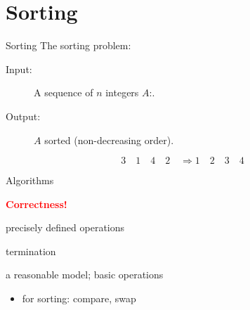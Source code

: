 \section{Sorting}

\begin{frame}{Sorting}
  The sorting problem:
  \begin{description}
	\item[Input:] A sequence of $n$ integers $A$:.
	\item[Output:] $A$ sorted {\small (non-decreasing order)}.
  \end{description}

  \[
	3\quad 1\quad 4\quad 2\quad \Longrightarrow 1\quad 2\quad 3\quad 4
  \]


\end{frame}
\begin{frame}{Algorithms}

  \pause
  \begin{center}
	\textcolor{red}{\bf Correctness!}
  \end{center}

  \pause

  \begin{description}[Effectiveness:]
	\item[Definiteness:] precisely defined operations
	  \pause
	\item[Finiteness:] termination
	  \pause
	\item[Effectiveness:] a reasonable model; basic operations %
	  \pause
	  \begin{itemize}
		\item for sorting: compare, swap
	  \end{itemize}
  \end{description}
\end{frame}
